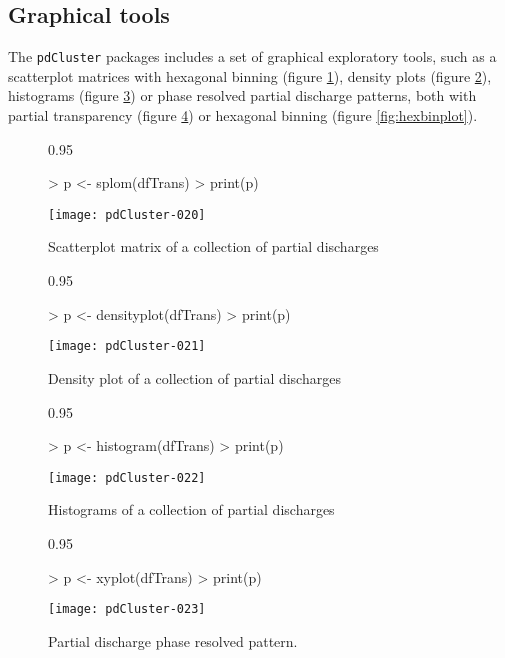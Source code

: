\documentclass{article}
\renewenvironment{Schunk}{\begin{center}
    \scriptsize
    \begin{boxedminipage}{0.95\textwidth}}{
    \end{boxedminipage}\end{center}}
\begin{document}
\subsection{Graphical tools}
\label{sec:graphics}

The \texttt{pdCluster} packages includes a set of graphical
exploratory tools, such as a scatterplot matrices with hexagonal
binning \cite{Carr.Littlefield.ea1987} (figure \ref{fig:splom}), density plots (figure
\ref{fig:density}), histograms (figure \ref{fig:histograms}) or phase
resolved partial discharge patterns, both with partial transparency
(figure \ref{fig:xyplot}) or hexagonal binning (figure
\ref{fig:hexbinplot}).

\begin{figure}
  \centering
\begin{Schunk}
\begin{Sinput}
> p <- splom(dfTrans)
> print(p)
\end{Sinput}
\end{Schunk}
\texttt{[image: pdCluster-020]}
  \caption{Scatterplot matrix of a collection of partial discharges}
  \label{fig:splom}
\end{figure}

\begin{figure}
  \centering
\begin{Schunk}
\begin{Sinput}
> p <- densityplot(dfTrans)
> print(p)
\end{Sinput}
\end{Schunk}
\texttt{[image: pdCluster-021]}
  \caption{Density plot of a collection of partial discharges}
  \label{fig:density}
\end{figure}

\begin{figure}
  \centering
\begin{Schunk}
\begin{Sinput}
> p <- histogram(dfTrans)
> print(p)
\end{Sinput}
\end{Schunk}
\texttt{[image: pdCluster-022]}
  \caption{Histograms of a collection of partial discharges}
  \label{fig:histograms}
\end{figure}

\begin{figure}
  \centering
\begin{Schunk}
\begin{Sinput}
> p <- xyplot(dfTrans)
> print(p)
\end{Sinput}
\end{Schunk}
\texttt{[image: pdCluster-023]}
  \caption{Partial discharge phase resolved pattern.}
  \label{fig:xyplot}
\end{figure}
 
\end{document}
